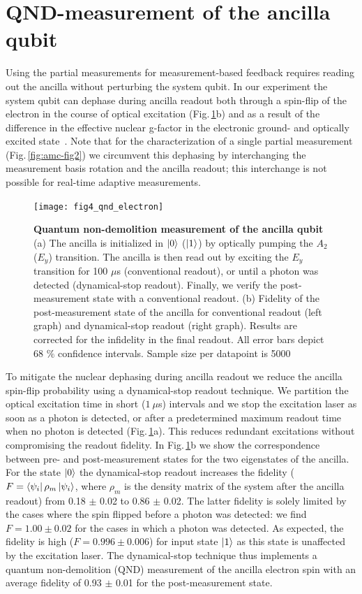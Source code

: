 \section{QND-measurement of the ancilla qubit}
Using the partial measurements for measurement-based feedback requires reading out the ancilla without perturbing the system qubit. In our experiment the system qubit can dephase during ancilla readout both through a spin-flip of the electron in the course of optical excitation (Fig.\,\ref{fig:amc-fig4}b) and as a result of the difference in the effective nuclear g-factor in the electronic ground- and optically excited state~\cite{Jiang_PRL_2008}. Note that for the characterization of a single partial measurement (Fig.\,\ref{fig:amc-fig2}) we circumvent this dephasing by interchanging the measurement basis rotation and the ancilla readout; this interchange is not possible for real-time adaptive measurements.

\begin{figure}
	\centering
	\texttt{[image: fig4\_qnd\_electron]}
	\caption{\label{fig:amc-fig4} \textbf{Quantum non-demolition measurement of the ancilla qubit} (a) The ancilla is initialized in $\left|0\right>$ ($\left|1\right>$) by optically pumping the $A_2$ ($E_y$) transition. The ancilla is then read out by exciting the $E_y$ transition for 100 $\mu$s (conventional readout), or until a photon was detected (dynamical-stop readout). Finally, we verify the post-measurement state with a conventional readout. (b) Fidelity of the post-measurement state of the ancilla for conventional readout (left graph) and dynamical-stop readout (right graph). Results are corrected for the infidelity in the final readout.  All error bars depict 68 $\%$ confidence intervals. Sample size per datapoint is 5000 }
\end{figure}

To mitigate the nuclear dephasing during ancilla readout we reduce the ancilla spin-flip probability using a dynamical-stop readout technique. We partition the optical excitation time in short ($1~ \mu$s) intervals and we stop the excitation laser as soon as a photon is detected, or after a predetermined maximum readout time when no photon is detected (Fig.\,\ref{fig:amc-fig4}a). This reduces redundant excitations without compromising the readout fidelity. In Fig.\,\ref{fig:amc-fig4}b we show the correspondence between pre- and post-measurement states for the two eigenstates of the ancilla. For the state $\left|0\right>$ the dynamical-stop readout increases the fidelity ($F = \left<\psi_i\right|\rho_m \left|\psi_i\right>$, where $\rho_m$ is the density matrix of the system after the ancilla readout) from 0.18 $\pm$ 0.02 to 0.86 $\pm$ 0.02. The latter fidelity is solely limited by the cases where the spin flipped before a photon was detected: we find $F = 1.00 \pm 0.02$ for the cases in which a photon was detected. As expected, the fidelity is high ($F = 0.996 \pm 0.006$) for input state $\left|1\right>$ as this state is unaffected by the excitation laser. The dynamical-stop technique thus implements a quantum non-demolition (QND) measurement of the ancilla electron spin with an average fidelity of 0.93 $\pm$ 0.01 for the post-measurement state.

